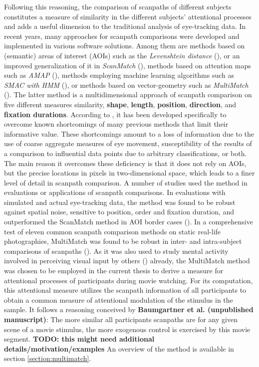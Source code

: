 \documentclass[a4paper, 12pt]{scrreprt}
\begin{document}
Following this reasoning, the comparison of scanpaths of different subjects constitutes a measure of similarity in the different subjects’ attentional processes and adds a useful dimension to the traditional analysis of eye-tracking data. \newline
In recent years, many approaches for scanpath comparisons were developed and implemented in various software solutions. Among them are methods based on (semantic) areas of interest (AOIs) such as the \textit{Levenshtein distance} (\cite{levenshtein1966binary}), or an improved generalization of it in \textit{ScanMatch} (\cite{cristino2010scanmatch}), methods based on attention maps such as \textit{AMAP} (\cite{ouerhani2004empirical}), methods employing machine learning algorithms such as \textit{SMAC with HMM} (\cite{coutrot2018scanpath}), or methods based on vector-geometry such as \textit{MultiMatch} (\cite{jarodzka2010vector}). The latter method is a multidimensional approach of scanpath comparison on five different measures similarity, \textbf{shape}, \textbf{length}, \textbf{position}, \textbf{direction}, and \textbf{fixation durations}. According to \textcite{jarodzka2010vector}, it has been developed specifically to overcome known shortcomings of many previous methods that limit their informative value. These shortcomings amount to a loss of information due to the use of coarse aggregate measures of eye movement, susceptibility of the results of a comparison to influential data points due to arbitrary classifications, or both. The main reason it overcomes these deficiency is that it does not rely on AOIs, but the precise locations in pixels in two-dimensional space, which leads to a finer level of detail in scanpath comparison. \newline A number of studies used the method in evaluations or applications of scanpath comparisons. In evaluations with simulated and actual eye-tracking data, the method was found to be robust against spatial noise, sensitive to position, order and fixation duration, and outperformed the ScanMatch method in AOI border cases (\cite{dewhurst2012depends}). In a comprehensive test of eleven common scanpath comparison methods on static real-life photographies, MultiMatch was found to be robust in inter- and intra-subject comparisons of scanpaths (\cite{anderson2015comparison}). As it was also used to study mental activity involved in perceiving visual input by others (\cite{french2017evaluation}) already, the MultiMatch method was chosen to be employed in the current thesis to derive a measure for attentional processes of participants during movie watching. \newline
For its computation, this attentional measure utilizes the scanpath information of all participants to obtain a common measure of attentional modulation of the stimulus in the sample. It follows a reasoning conceived by \textbf{Baumgartner et al. (unpublished manuscript)}: The more similar all participants scanpaths are for any given scene of a movie stimulus, the more exogenous control is exercised by this movie segment. \textbf{TODO: this might need additional details/motivation/examples} \newline
An overview of the method is available in section \ref{section:multimatch}.
 
\end{document}
